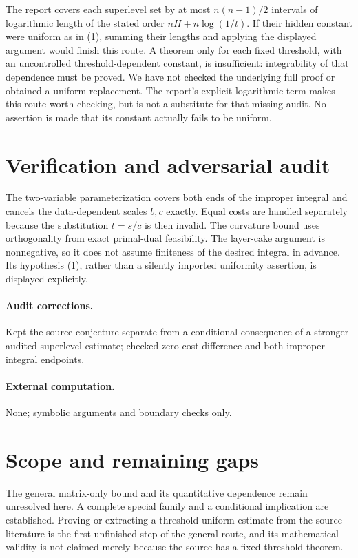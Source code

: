 \documentclass[11pt]{article}
\begin{document}
The report covers each superlevel set by at most $n(n-1)/2$ intervals of logarithmic length of the stated order $nH+n\log(1/t)$. If their hidden constant were uniform as in (1), summing their lengths and applying the displayed argument would finish this route. A theorem only for each fixed threshold, with an uncontrolled threshold-dependent constant, is insufficient: integrability of that dependence must be proved. We have not checked the underlying full proof or obtained a uniform replacement. The report's explicit logarithmic term makes this route worth checking, but is not a substitute for that missing audit. No assertion is made that its constant actually fails to be uniform.

\section{Verification and adversarial audit}
The two-variable parameterization covers both ends of the improper integral and cancels the data-dependent scales $b,c$ exactly. Equal costs are handled separately because the substitution $t=s/c$ is then invalid. The curvature bound uses orthogonality from exact primal-dual feasibility. The layer-cake argument is nonnegative, so it does not assume finiteness of the desired integral in advance. Its hypothesis (1), rather than a silently imported uniformity assertion, is displayed explicitly.
\paragraph{Audit corrections.} Kept the source conjecture separate from a conditional consequence of a stronger audited superlevel estimate; checked zero cost difference and both improper-integral endpoints.
\paragraph{External computation.} None; symbolic arguments and boundary checks only.
\section{Scope and remaining gaps}
The general matrix-only bound and its quantitative dependence remain unresolved here. A complete special family and a conditional implication are established. Proving or extracting a threshold-uniform estimate from the source literature is the first unfinished step of the general route, and its mathematical validity is not claimed merely because the source has a fixed-threshold theorem.
\end{document}
